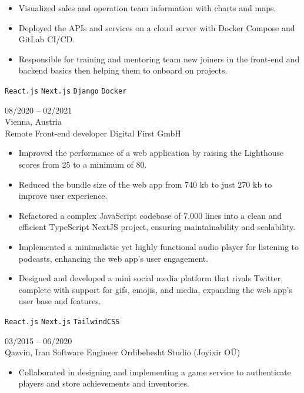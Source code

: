 \documentclass[8pt]{developercv} %
\begin{document}
\begin{entrylist}
{\begin{itemize}[noitemsep,topsep=0pt,parsep=0pt,partopsep=0pt, leftmargin=-1pt]
                \item Visualized sales and operation team information with charts and maps.
                \item Deployed the APIs and services on a cloud server with Docker Compose and GitLab CI/CD.
                \item Responsible for training and mentoring team new joiners in the front-end and backend basics then helping them to onboard on projects.
            \end{itemize}
            \texttt{React.js} \slashsep \texttt{Next.js} \slashsep \texttt{Django} \slashsep \texttt{Docker}
        }
        \entry
        {08/2020 -- 02/2021 \\ Vienna, Austria \\ Remote}
        {Front-end developer}
        {Digital First GmbH}
        {\vspace{-10pt}
            \begin{itemize}[noitemsep,topsep=0pt,parsep=0pt,partopsep=0pt, leftmargin=-1pt]
                \item Improved the performance of a web application by raising the Lighthouse scores from 25 to a minimum of 80.
                \item Reduced the bundle size of the web app from 740 kb to just 270 kb to improve user experience.
                \item Refactored a complex JavaScript codebase of 7,000 lines into a clean and efficient TypeScript NextJS project, ensuring maintainability and scalability.
                \item Implemented a minimalistic yet highly functional audio player for listening to podcasts, enhancing the web app's user engagement.
                \item Designed and developed a mini social media platform that rivals Twitter, complete with support for gifs, emojis, and media, expanding the web app's user base and features.
            \end{itemize}
            \texttt{React.js} \slashsep \texttt{Next.js} \slashsep \texttt{TailwindCSS}
        }
        \entry
        {03/2015 -- 06/2020 \\ Qazvin, Iran}
        {Software Engineer}
        {Ordibehesht Studio {\small (Joyixir OÜ)}}
        {\vspace{-10pt}
            \begin{itemize}[noitemsep,topsep=0pt,parsep=0pt,partopsep=0pt, leftmargin=-1pt]
                \item Collaborated in designing and implementing a game service to authenticate players and store achievements and inventories.

\end{itemize}}
\end{entrylist}
\end{document}
